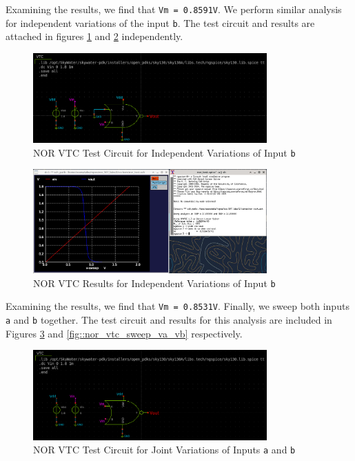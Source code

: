 \documentclass[fleqn]{article}
\begin{document}
	Examining the results, we find that \texttt{Vm = 0.8591V}. We perform similar analysis for independent variations of the input \texttt{b}. The test circuit and results are attached in figures \ref{fig::nor_vtc_test_sweep_vb} and \ref{fig::nor_vtc_sweep_vb} independently.
	
	\begin{figure}[H]
		\centerline{\includegraphics[width=0.8\textwidth]{nor_vtc_test_sweep_vb.png}}
		\caption{NOR VTC Test Circuit for Independent Variations of Input \texttt{b}}
		\label{fig::nor_vtc_test_sweep_vb}
	\end{figure}
	
	\begin{figure}[H]
		\centerline{\includegraphics[width=0.8\textwidth]{nor_vtc_sweep_vb.png}}
		\caption{NOR VTC Results for Independent Variations of Input \texttt{b}}
		\label{fig::nor_vtc_sweep_vb}
	\end{figure}
	
	Examining the results, we find that \texttt{Vm = 0.8531V}. Finally, we sweep both inputs \texttt{a} and \texttt{b} together. The test circuit and results for this analysis are included in Figures \ref{fig::nor_vtc_test_sweep_va_vb} and \ref{fig::nor_vtc_sweep_va_vb} respectively.
	
	\begin{figure}[H]
		\centerline{\includegraphics[width=0.8\textwidth]{nor_vtc_test_sweep_va_vb.png}}
		\caption{NOR VTC Test Circuit for Joint Variations of Inputs \texttt{a} and \texttt{b}}
		\label{fig::nor_vtc_test_sweep_va_vb}
	\end{figure}
	
\end{document}
